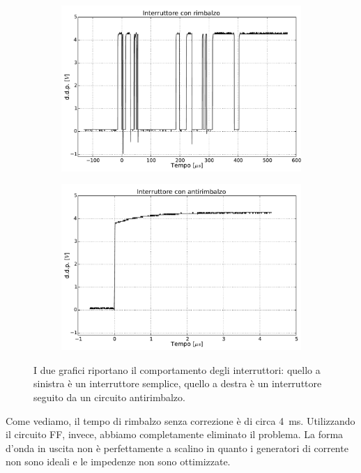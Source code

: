 \begin{figure}[htpc]
\centering
	\begin{subfigure}[hc]{.49\textwidth}
		\centering
		\includegraphics[width=.99\textwidth]{../E11/latex/rimb.pdf}
		\caption{}
		\label{gr11:rimb}
        \end{subfigure}%
        \begin{subfigure}[hc]{.49\textwidth}
		\centering
		\includegraphics[width=.99\textwidth]{../E11/latex/antirimb.pdf}
		\caption{}
		\label{gr11:no-rimb}
        \end{subfigure}
\caption{I due grafici riportano il comportamento degli interruttori: quello a sinistra è un interruttore semplice, quello a destra è un interruttore seguito da un circuito antirimbalzo.}
\end{figure}


Come vediamo, il tempo di rimbalzo senza correzione è di circa \SI{4}{\milli\second}.
Utilizzando il circuito FF, invece, abbiamo completamente eliminato il problema.
La forma d'onda in uscita non è perfettamente a scalino in quanto i generatori di corrente non sono ideali e le impedenze non sono ottimizzate.

